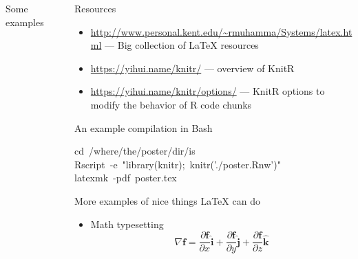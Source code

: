 \documentclass[capfont, final]{beamer}\usepackage[]{graphicx}\usepackage[]{color}
\makeatletter
\newcommand{\hlstr}[1]{\textcolor[rgb]{0.192,0.494,0.8}{#1}}%
\newcommand{\hlopt}[1]{\textcolor[rgb]{0,0,0}{#1}}%
\newcommand{\hlstd}[1]{\textcolor[rgb]{0.345,0.345,0.345}{#1}}%
\newcommand{\hlkwb}[1]{\textcolor[rgb]{0.69,0.353,0.396}{#1}}%
\newenvironment{kframe}{%
 \def\at@end@of@kframe{}%
 \ifinner\ifhmode%
  \def\at@end@of@kframe{\end{minipage}}%
  \begin{minipage}{\columnwidth}%
 \fi\fi%
 \def\FrameCommand##1{\hskip\@totalleftmargin \hskip-\fboxsep
 \colorbox{shadecolor}{##1}\hskip-\fboxsep
     \hskip-\linewidth \hskip-\@totalleftmargin \hskip\columnwidth}%
 \MakeFramed {\advance\hsize-\width
   \@totalleftmargin\z@ \linewidth\hsize
   \@setminipage}}%
 {\par\unskip\endMakeFramed%
 \at@end@of@kframe}
\newenvironment{knitrout}{}{} %
\newlength{\sepwid}
\newlength{\onecolwid}
\newlength{\twocolwid}
\makeatother
\begin{document}
\begin{frame}[t, fragile]
\begin{columns}[T]
\begin{column}{\twocolwid}
\begin{block}{Some examples}
				\end{block}
		\end{column} %
		\begin{column}{\sepwid} \end{column} %
		\begin{column}{\onecolwid} %
				\begin{block}{Resources}
					\begin{itemize}
						\item \url{http://www.personal.kent.edu/~rmuhamma/Systems/latex.html} --- Big collection of \LaTeX{} resources
						\item \url{https://yihui.name/knitr/} --- overview of KnitR
						\item \url{https://yihui.name/knitr/options/} --- KnitR options to modify the behavior of R code chunks
					\end{itemize}
				\end{block}
				\begin{block}{An example compilation in Bash}
\begin{knitrout}\small
{}\color{fgcolor}\begin{kframe}
\noindent
\ttfamily
\hlstd{}\hlkwb{cd\ }\hlstd{}\hlopt{/}\hlstd{where}\hlopt{/}\hlstd{the}\hlopt{/}\hlstd{poster}\hlopt{/}\hlstd{dir}\hlopt{/}\hlstd{is\hspace*{\fill}\\
Rscript\ }\hlopt{{-}}\hlstd{e\ }\hlstr{"library(knitr);\ knitr('./poster.Rnw')"}\hlstd{\hspace*{\fill}\\
latexmk\ }\hlopt{{-}}\hlstd{pdf\ poster.tex}\hspace*{\fill}
\mbox{}
\normalfont
\end{kframe}
\end{knitrout}
				\end{block}
				\begin{block}{More examples of nice things \LaTeX{} can do}
					\begin{itemize}
							\item Math typesetting
									\vspace{0.25em}
									\begin{equation}
											\nabla \mathbf{f} = \frac{\partial\mathbf{f}}{\partial x}\mathbf{\hat{i}} + \frac{\partial\mathbf{f}}{\partial y}\mathbf{\hat{j}} + \frac{\partial\mathbf{f}}{\partial z}\mathbf{\hat{k}}
									\end{equation}

\end{itemize}
\end{block}
\end{column}
\end{columns}
\end{frame}
\end{document}
